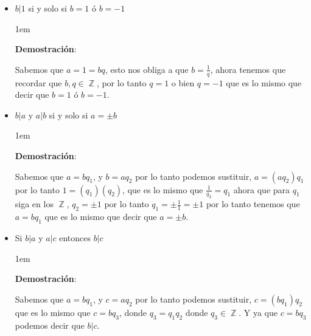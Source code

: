 \documentclass[12pt, fleqn]{report}                             %
\newenvironment{SmallIndentation}[1][0.75em]                    %
    {\begin{adjustwidth}{#1}{}\begin{footnotesize}}                 %
    {\end{footnotesize}\end{adjustwidth}}                           %
\DeclareMathOperator \Integers  {\mathbb{Z}}                     %
\begin{document}
\begin{itemize}
                \item $b|1$ si y solo si $b=1$ ó $b=-1$

                    \begin{SmallIndentation}[1em]
                        \textbf{Demostración}:

                        Sabemos que $a=1=bq$, esto nos obliga a que $b=\frac{1}{q}$, ahora tenemos que
                        recordar que $b, q \in \Integers$, por lo tanto $q=1$ o bien $q=-1$ que es lo
                        mismo que decir que $b=1$ ó $b=-1$. 

                    \end{SmallIndentation}


                \item $b|a$ y $a|b$ si y solo si $a=\pm b$

                    \begin{SmallIndentation}[1em]
                        \textbf{Demostración}:

                        Sabemos que $a=bq_1$, y $b=aq_2$ por lo tanto podemos sustituir, 
                        $a=(aq_2)q_1$ por lo tanto $1=(q_1)(q_2)$, que es lo mismo que
                        $\frac{1}{q_2}=q_1$ ahora que para $q_1$ siga en los $\Integers$,
                        $q_2 = \pm 1$ por lo tanto $q_1 = \pm \frac{1}{1} = \pm 1$ por
                        lo tanto tenemos que $a = bq_1$ que es lo mismo que decir que $a = \pm b$.

                    \end{SmallIndentation}


                \item Si $b|a$ y $a|c$ entonces $b|c$

                    \begin{SmallIndentation}[1em]
                        \textbf{Demostración}:

                        Sabemos que $a=bq_1$, y $c=aq_2$ por lo tanto podemos sustituir, 
                        $c=(bq_1)q_2$ que es lo mismo que $c=bq_3$, donde $q_3 = q_1q_2$
                        donde $q_3 \in \Integers$. 
                        Y ya que $c=bq_3$ podemos decir que $b|c$.

                    \end{SmallIndentation}


\end{itemize}
\end{document}
